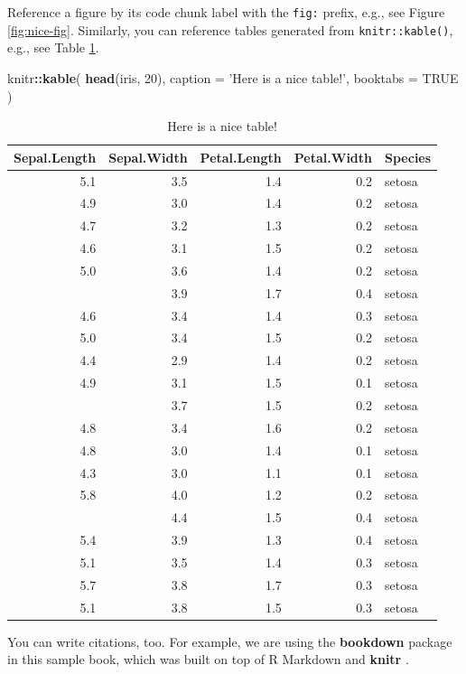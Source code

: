 \documentclass[]{book}
\newenvironment{Shaded}{\begin{snugshade}}{\end{snugshade}}
\newcommand{\DataTypeTok}[1]{\textcolor[rgb]{0.13,0.29,0.53}{#1}}
\newcommand{\DecValTok}[1]{\textcolor[rgb]{0.00,0.00,0.81}{#1}}
\newcommand{\KeywordTok}[1]{\textcolor[rgb]{0.13,0.29,0.53}{\textbf{#1}}}
\newcommand{\NormalTok}[1]{#1}
\newcommand{\OperatorTok}[1]{\textcolor[rgb]{0.81,0.36,0.00}{\textbf{#1}}}
\newcommand{\OtherTok}[1]{\textcolor[rgb]{0.56,0.35,0.01}{#1}}
\newcommand{\StringTok}[1]{\textcolor[rgb]{0.31,0.60,0.02}{#1}}
\begin{document}
Reference a figure by its code chunk label with the \texttt{fig:} prefix, e.g., see Figure \ref{fig:nice-fig}. Similarly, you can reference tables generated from \texttt{knitr::kable()}, e.g., see Table \ref{tab:nice-tab}.

\begin{Shaded}
\begin{Highlighting}[]
\NormalTok{knitr}\OperatorTok{::}\KeywordTok{kable}\NormalTok{(}
  \KeywordTok{head}\NormalTok{(iris, }\DecValTok{20}\NormalTok{), }\DataTypeTok{caption =} \StringTok{'Here is a nice table!'}\NormalTok{,}
  \DataTypeTok{booktabs =} \OtherTok{TRUE}
\NormalTok{)}
\end{Highlighting}
\end{Shaded}

\begin{table}

\caption{\label{tab:nice-tab}Here is a nice table!}
\centering
\begin{tabular}[t]{rrrrl}
\toprule
Sepal.Length & Sepal.Width & Petal.Length & Petal.Width & Species\\
\midrule
5.1 & 3.5 & 1.4 & 0.2 & setosa\\
4.9 & 3.0 & 1.4 & 0.2 & setosa\\
4.7 & 3.2 & 1.3 & 0.2 & setosa\\
4.6 & 3.1 & 1.5 & 0.2 & setosa\\
5.0 & 3.6 & 1.4 & 0.2 & setosa\\
\addlinespace
5.4 & 3.9 & 1.7 & 0.4 & setosa\\
4.6 & 3.4 & 1.4 & 0.3 & setosa\\
5.0 & 3.4 & 1.5 & 0.2 & setosa\\
4.4 & 2.9 & 1.4 & 0.2 & setosa\\
4.9 & 3.1 & 1.5 & 0.1 & setosa\\
\addlinespace
5.4 & 3.7 & 1.5 & 0.2 & setosa\\
4.8 & 3.4 & 1.6 & 0.2 & setosa\\
4.8 & 3.0 & 1.4 & 0.1 & setosa\\
4.3 & 3.0 & 1.1 & 0.1 & setosa\\
5.8 & 4.0 & 1.2 & 0.2 & setosa\\
\addlinespace
5.7 & 4.4 & 1.5 & 0.4 & setosa\\
5.4 & 3.9 & 1.3 & 0.4 & setosa\\
5.1 & 3.5 & 1.4 & 0.3 & setosa\\
5.7 & 3.8 & 1.7 & 0.3 & setosa\\
5.1 & 3.8 & 1.5 & 0.3 & setosa\\
\bottomrule
\end{tabular}
\end{table}

You can write citations, too. For example, we are using the \textbf{bookdown} package \citep{R-bookdown} in this sample book, which was built on top of R Markdown and \textbf{knitr} \citep{xie2015}.


\end{document}
